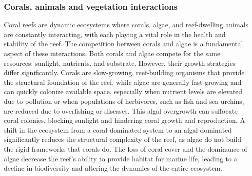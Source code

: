 
\subsubsection{Corals, animals and vegetation interactions}

Coral reefs are dynamic ecosystems where corals, algae, and reef-dwelling animals are constantly interacting, with each playing a vital role in the health and stability of the reef. The competition between corals and algae is a fundamental aspect of these interactions. Both corals and algae compete for the same resources: sunlight, nutrients, and substrate. However, their growth strategies differ significantly. Corals are slow-growing, reef-building organisms that provide the structural foundation of the reef, while algae are generally fast-growing and can quickly colonize available space, especially when nutrient levels are elevated due to pollution or when populations of herbivores, such as fish and sea urchins, are reduced due to overfishing or diseases. This algal overgrowth can suffocate coral colonies, blocking sunlight and hindering coral growth and reproduction. A shift in the ecosystem from a coral-dominated system to an algal-dominated significantly reduces the structural complexity of the reef, as algae do not build the rigid frameworks that corals do. The loss of coral cover and the dominance of algae decrease the reef's ability to provide habitat for marine life, leading to a decline in biodiversity and altering the dynamics of the entire ecosystem.

